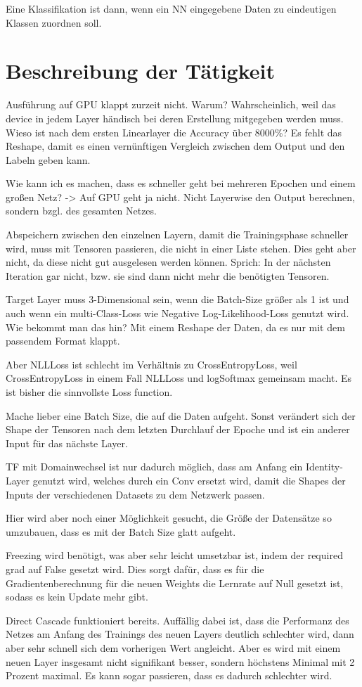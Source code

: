 Eine Klassifikation ist dann, wenn ein NN eingegebene Daten zu 
    eindeutigen Klassen zuordnen soll.

\section{Beschreibung der Tätigkeit}
    
    Ausführung auf GPU klappt zurzeit nicht. Warum? Wahrscheinlich, 
    weil das device in jedem Layer händisch bei deren Erstellung mitgegeben 
    werden muss.
    Wieso ist nach dem ersten Linearlayer die Accuracy über 8000\%?
    Es fehlt das Reshape, damit es einen vernünftigen Vergleich 
    zwischen dem Output und den Labeln geben kann.
    
    Wie kann ich es machen, dass es schneller geht bei mehreren Epochen 
    und einem großen Netz? -> Auf GPU geht ja nicht.
    Nicht Layerwise den Output berechnen, sondern bzgl. des gesamten Netzes.

    Abspeichern zwischen den einzelnen Layern, damit die Trainingsphase 
    schneller wird, muss mit Tensoren passieren, die nicht in einer Liste 
    stehen. Dies geht aber nicht, da diese nicht gut ausgelesen werden können. 
    Sprich: In der nächsten Iteration gar nicht, bzw. sie sind dann nicht 
    mehr die benötigten Tensoren.

    Target Layer muss 3-Dimensional sein, wenn die Batch-Size größer als 1 
    ist und auch wenn ein multi-Class-Loss wie Negative Log-Likelihood-Loss 
    genutzt wird. Wie bekommt man das hin?
    Mit einem Reshape der Daten, da es nur mit dem passendem Format klappt. 

    Aber NLLLoss ist schlecht im Verhältnis zu CrossEntropyLoss, weil 
    CrossEntropyLoss in einem Fall NLLLoss und logSoftmax gemeinsam macht.
    Es ist bisher die sinnvollste Loss function.

    Mache lieber eine Batch Size, die auf die Daten aufgeht. Sonst verändert 
    sich der Shape der Tensoren nach dem letzten Durchlauf der Epoche und ist 
    ein anderer Input für das nächste Layer.

    TF mit Domainwechsel ist nur dadurch möglich, dass am Anfang ein 
    Identity-Layer genutzt wird, welches durch ein Conv ersetzt wird, 
    damit die Shapes der Inputs der verschiedenen Datasets zu dem 
    Netzwerk passen.

    Hier wird aber noch einer Möglichkeit gesucht, die Größe der 
    Datensätze so umzubauen, dass es mit der Batch Size glatt aufgeht.

    Freezing wird benötigt, was aber sehr leicht umsetzbar ist, indem 
    der required grad auf False gesetzt wird. Dies sorgt dafür, dass 
    es für die Gradientenberechnung für die neuen Weights die Lernrate 
    auf Null gesetzt ist, sodass es kein Update mehr gibt.

    Direct Cascade funktioniert bereits. Auffällig dabei ist, dass 
    die Performanz des Netzes am Anfang des Trainings des neuen Layers 
    deutlich schlechter wird, dann aber sehr schnell sich dem vorherigen 
    Wert angleicht. Aber es wird mit einem neuen Layer insgesamt nicht 
    signifikant besser, sondern höchstens Minimal mit 2 Prozent maximal. 
    Es kann sogar passieren, dass es dadurch schlechter wird.
    